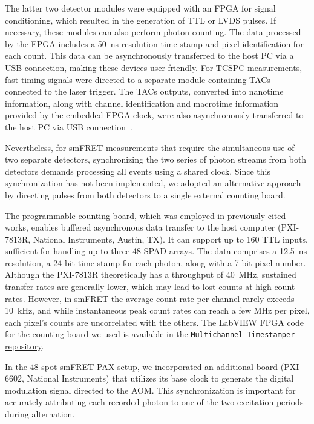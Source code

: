 The latter two detector modules were equipped with an \ac{FPGA} for signal conditioning, which resulted in the generation of \ac{TTL} or \ac{LVDS} pulses. 
If necessary, these modules can also perform photon counting. 
The data processed by the \ac{FPGA} includes a 50~ns resolution time-stamp and pixel identification for each count. 
This data can be asynchronously transferred to the host PC via a USB connection, making these devices user-friendly. 
For \ac{TCSPC} measurements, fast timing signals were directed to a separate module containing \ac{TACs} connected to the laser trigger.
The \ac{TACs} outputs, converted into nanotime information, along with channel identification and macrotime information provided by the embedded \ac{FPGA} clock, were also asynchronously transferred to the host PC via USB connection~\cite{cuccato_IEEEPJ_2013}.

Nevertheless, for \ac{smFRET} measurements that require the simultaneous use of two separate detectors, synchronizing the two series of photon streams from both detectors demands processing all events using a shared clock. 
Since this synchronization has not been implemented, we adopted an alternative approach by directing pulses from both detectors to a single external counting board.

The programmable counting board, which was employed in previously cited works, enables buffered asynchronous data transfer to the host computer (PXI-7813R, National Instruments, Austin, TX). 
It can support up to 160 \ac{TTL} inputs, sufficient for handling up to three 48-\ac{SPAD} arrays. 
The data comprises a 12.5~ns resolution, a 24-bit time-stamp for each photon, along with a 7-bit pixel number. 
Although the PXI-7813R theoretically has a throughput of 40~MHz, sustained transfer rates are generally lower, which may lead to lost counts at high count rates. 
However, in \ac{smFRET} the average count rate per channel rarely exceeds 10~kHz, and while instantaneous peak count rates can reach a few MHz per pixel, each pixel's counts are uncorrelated with the others. 
The LabVIEW \ac{FPGA} code for the counting board we used is available in the \texttt{Multichannel-Timestamper} \href{https://github.com/multispot-software/MultichannelTimestamper}{repository}.

In the 48-spot smFRET-PAX setup, we incorporated an additional board (PXI-6602, National Instruments) that utilizes its base clock to generate the digital modulation signal directed to the \ac{AOM}.
This synchronization is important for accurately attributing each recorded photon to one of the two excitation periods during alternation.

